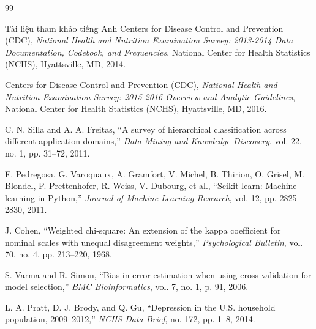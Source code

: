\documentclass{uetgraduation}
\begin{document}
\begin{thebibliography}{99}
\begin{bibsection}{Tài liệu tham khảo tiếng Anh}
    Centers for Disease Control and Prevention (CDC),
    \textit{National Health and Nutrition Examination Survey: 2013-2014 Data Documentation, Codebook, and Frequencies},
    National Center for Health Statistics (NCHS), Hyattsville, MD, 2014.

    Centers for Disease Control and Prevention (CDC),
    \textit{National Health and Nutrition Examination Survey: 2015-2016 Overview and Analytic Guidelines},
    National Center for Health Statistics (NCHS), Hyattsville, MD, 2016.

    C. N. Silla and A. A. Freitas,
    ``A survey of hierarchical classification across different application domains,''
    \textit{Data Mining and Knowledge Discovery}, vol. 22, no. 1, pp. 31--72, 2011.

    F. Pedregosa, G. Varoquaux, A. Gramfort, V. Michel, B. Thirion, O. Grisel, M. Blondel, P. Prettenhofer, R. Weiss, V. Dubourg, et al.,
    ``Scikit-learn: Machine learning in Python,''
    \textit{Journal of Machine Learning Research}, vol. 12, pp. 2825--2830, 2011.

    J. Cohen,
    ``Weighted chi-square: An extension of the kappa coefficient for nominal scales with unequal disagreement weights,''
    \textit{Psychological Bulletin}, vol. 70, no. 4, pp. 213--220, 1968.

    S. Varma and R. Simon,
    ``Bias in error estimation when using cross-validation for model selection,''
    \textit{BMC Bioinformatics}, vol. 7, no. 1, p. 91, 2006.

    L. A. Pratt, D. J. Brody, and Q. Gu,
    ``Depression in the {U.S.} household population, 2009--2012,''
    \textit{NCHS Data Brief}, no. 172, pp. 1--8, 2014.
\end{bibsection}

\end{thebibliography}
\end{document}
